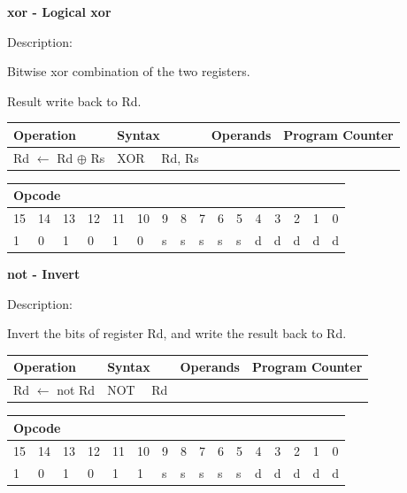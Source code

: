 \documentclass[%
	pdftex,
	a4paper,
	oneside,
	bibtotoc,%
	idxtotoc,%
	bibtotocnumbered,
	halfparskip,%
]{scrbook}
\begin{document}
\bigskip

\textbf{xor - Logical xor}

Description:

Bitwise xor combination of the two registers.

Result write back to Rd.

\begin{tabular}{|l|l|l|l|}
\hline
Operation & Syntax & Operands & Program Counter \\ \hline
Rd $\leftarrow $ Rd $\oplus $ Rs & XOR \ \ Rd, Rs &  &  \\ \hline
\end{tabular}

\begin{tabular}{|c|c|c|c|c|c|c|c|c|c|c|c|c|c|c|c|}
\hline
\multicolumn{6}{|l|}{Opcode} & \multicolumn{5}{|l|}{} & \multicolumn{5}{|l|}{
} \\ \hline
15 & 14 & 13 & 12 & 11 & 10 & 9 & 8 & 7 & 6 & 5 & 4 & 3 & 2 & 1 & 0 \\ \hline
\multicolumn{1}{|l|}{1} & \multicolumn{1}{|l|}{0} & \multicolumn{1}{|l|}{1}
& \multicolumn{1}{|l|}{0} & \multicolumn{1}{|l|}{1} & \multicolumn{1}{|l|}{0}
& \multicolumn{1}{|l|}{s} & \multicolumn{1}{|l|}{s} & \multicolumn{1}{|l|}{s}
& \multicolumn{1}{|l|}{s} & \multicolumn{1}{|l|}{s} & \multicolumn{1}{|l|}{d}
& \multicolumn{1}{|l|}{d} & \multicolumn{1}{|l|}{d} & \multicolumn{1}{|l|}{d}
& \multicolumn{1}{|l|}{d} \\ \hline
\end{tabular}

\bigskip

\textbf{not - Invert }

Description:

Invert the bits of register Rd, and write the result back to Rd.

\begin{tabular}{|l|l|l|l|}
\hline
Operation & Syntax & Operands & Program Counter \\ \hline
Rd $\leftarrow $ not Rd & NOT \ \ Rd &  &  \\ \hline
\end{tabular}

\begin{tabular}{|c|c|c|c|c|c|c|c|c|c|c|c|c|c|c|c|}
\hline
\multicolumn{6}{|l|}{Opcode} & \multicolumn{5}{|l|}{} & \multicolumn{5}{|l|}{
} \\ \hline
15 & 14 & 13 & 12 & 11 & 10 & 9 & 8 & 7 & 6 & 5 & 4 & 3 & 2 & 1 & 0 \\ \hline
\multicolumn{1}{|l|}{1} & \multicolumn{1}{|l|}{0} & \multicolumn{1}{|l|}{1}
& \multicolumn{1}{|l|}{0} & \multicolumn{1}{|l|}{1} & \multicolumn{1}{|l|}{1}
& \multicolumn{1}{|l|}{s} & \multicolumn{1}{|l|}{s} & \multicolumn{1}{|l|}{s}
& \multicolumn{1}{|l|}{s} & \multicolumn{1}{|l|}{s} & \multicolumn{1}{|l|}{d}
& \multicolumn{1}{|l|}{d} & \multicolumn{1}{|l|}{d} & \multicolumn{1}{|l|}{d}
& \multicolumn{1}{|l|}{d} \\ \hline
\end{tabular}
\end{document}
